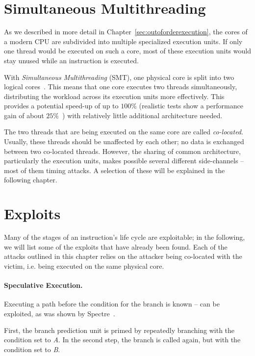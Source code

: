 \documentclass[11pt,
  titlepage=false,
]{scrreprt}
\begin{document}
\section{Simultaneous Multithreading}
\label{sec:smt}

As we described in more detail in Chapter~\ref{sec:outoforderexecution},
the cores of a modern CPU are subdivided into multiple specialized execution units.
If only one thread would be executed on such a core,
most of these execution units would stay unused while an instruction is executed.

With \textit{Simultaneous Multithreading} (SMT), one physical core is split into two logical cores~\cite{tullsen1995simultaneous}.
This means that one core executes two threads simultaneously, distributing the workload across its execution units more effectively.
This provides a potential speed-up of up to $100\%$
(realistic tests show a performance gain of about $25\%$~\cite{Phoronix2018HT, Cutress2020SMT})
with relatively little additional architecture needed.

The two threads that are being executed on the same core are called \textit{co-located}.
Usually, these threads should be unaffected by each other; no data is exchanged between two co-located threads.
However, the sharing of common architecture, particularly the execution units,
makes possible several different side-channels -- most of them timing attacks.
A selection of these will be explained in the following chapter.

\section{Exploits}
\label{sec:exploits}
Many of the stages of an instruction's life cycle are exploitable;
in the following, we will list some of the exploits that have already been found.
Each of the attacks outlined in this chapter relies on the attacker being co-located with the victim,
i.e. being executed on the same physical core.

\paragraph{Speculative Execution.}
Executing a path before the condition for the branch is known --
can be exploited, as was shown by Spectre~\cite{spKocherHFGGHHLM019}.

First, the branch prediction unit is primed by repeatedly branching with the condition set to \textit{A}.
In the second step, the branch is called again, but with the condition set to \textit{B}.
\end{document}
